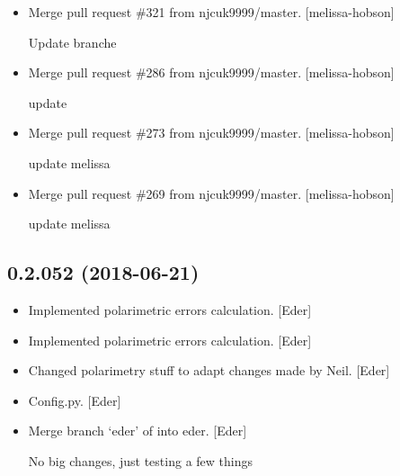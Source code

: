 \documentclass[a4paper,10pt,english]{report}
\begin{document}
\begin{itemize}
\item {} 
Merge pull request \#321 from njcuk9999/master. {[}melissa-hobson{]}

Update branche

\item {} 
Merge pull request \#286 from njcuk9999/master. {[}melissa-hobson{]}

update

\item {} 
Merge pull request \#273 from njcuk9999/master. {[}melissa-hobson{]}

update melissa

\item {} 
Merge pull request \#269 from njcuk9999/master. {[}melissa-hobson{]}

update melissa

\end{itemize}


\subsection{0.2.052 (2018-06-21)}
\label{\detokenize{misc/changelog:id414}}\begin{itemize}
\item {} 
Implemented polarimetric errors calculation. {[}Eder{]}

\item {} 
Implemented polarimetric errors calculation. {[}Eder{]}

\item {} 
Changed polarimetry stuff to adapt changes made by Neil. {[}Eder{]}

\item {} 
Config.py. {[}Eder{]}

\item {} 
Merge branch ‘eder’ of  into
eder. {[}Eder{]}

No big changes, just testing a few things

\end{itemize}
\end{document}
